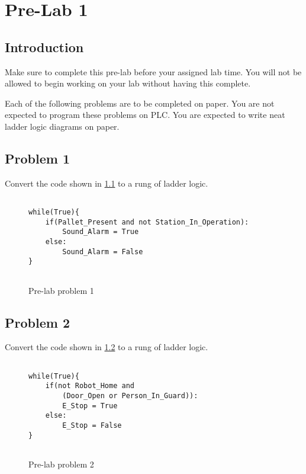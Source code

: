 \chapter{Pre-Lab 1}
\setcounter{TASignatures}{0}
\setcounter{AsideCounter}{0}


\section{Introduction}

Make sure to complete this pre-lab before your assigned lab time. You will not be allowed to begin working on your lab without having this complete.



Each of the following problems are to be completed on paper. You are not expected to program these problems on PLC. You are expected to write neat ladder logic diagrams on paper.



\section{Problem 1}

Convert the code shown in \figureautorefname \ref{fig:Problem1} to a rung of ladder logic.

\lstset{style=mystyle}
\lstset{language=python}
\begin{figure}[h]
\begin{lstlisting}[firstnumber=1]

while(True){
    if(Pallet_Present and not Station_In_Operation):
        Sound_Alarm = True
    else:
        Sound_Alarm = False
}
    
\end{lstlisting}
\caption{Pre-lab problem 1}
\label{fig:Problem1}
\end{figure}


\section{Problem 2}

Convert the code shown in \figureautorefname \ref{fig:Problem2} to a rung of ladder logic.

\lstset{style=mystyle}
\lstset{language=python}
\begin{figure}[h]
\begin{lstlisting}[firstnumber=1]

while(True){
    if(not Robot_Home and 
        (Door_Open or Person_In_Guard)):
        E_Stop = True
    else:
        E_Stop = False
}
    
\end{lstlisting}
\caption{Pre-lab problem 2}
\label{fig:Problem2}
\end{figure}



